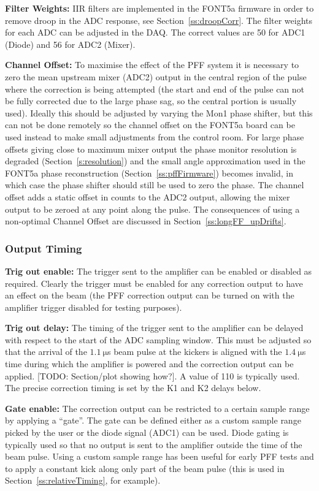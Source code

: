 \textbf{Filter Weights:} IIR filters are implemented in the FONT5a firmware in order to remove droop in the ADC response, see Section~\ref{ss:droopCorr}. The filter weights for each ADC can be adjusted in the DAQ. The correct values are 50 for ADC1 (Diode) and 56 for ADC2 (Mixer).

\textbf{Channel Offset:} To maximise the effect of the PFF system it is necessary to zero the mean upstream mixer (ADC2) output in the central region of the pulse where the correction is being attempted (the start and end of the pulse can not be fully corrected due to the large phase sag, so the central portion is usually used). Ideally this should be adjusted by varying the Mon1 phase shifter, but this can not be done remotely so the channel offset on the FONT5a board can be used instead to make small adjustments from the control room. For large phase offsets giving close to maximum mixer output the phase monitor resolution is degraded (Section~\ref{s:resolution}) and the small angle approximation used in the FONT5a phase reconstruction (Section~\ref{ss:pffFirmware}) becomes invalid, in which case the phase shifter should still be used to zero the phase. The channel offset adds a static offset in counts to the ADC2 output, allowing the mixer output to be zeroed at any point along the pulse. The consequences of using a non-optimal Channel Offset are discussed in Section~\ref{ss:longFF_upDrifts}.

\subsubsection{Output Timing}

\textbf{Trig out enable:} The trigger sent to the amplifier can be enabled or disabled as required. Clearly the trigger must be enabled for any correction output to have an effect on the beam (the PFF correction output can be turned on with the amplifier trigger disabled for testing purposes).

\textbf{Trig out delay:} The timing of the trigger sent to the amplifier can be delayed with respect to the start of the ADC sampling window. This must be adjusted so that the arrival of the \(1.1~\mathrm{\mu}\)s beam pulse at the kickers is aligned with the \(1.4~\mathrm{\mu}\)s time during which the amplifier is powered and the correction output can be applied. [TODO: Section/plot showing how?]. A value of 110 is typically used. The precise correction timing is set by the K1 and K2 delays below.

\textbf{Gate enable:} The correction output can be restricted to a certain sample range by applying a ``gate''. The gate can be defined either as a custom sample range picked by the user or the diode signal (ADC1) can be used. Diode gating is typically used so that no output is sent to the amplifier outside the time of the beam pulse. Using a custom sample range has been useful for early PFF tests and to apply a constant kick along only part of the beam pulse (this is used in Section~\ref{ss:relativeTiming}, for example).

